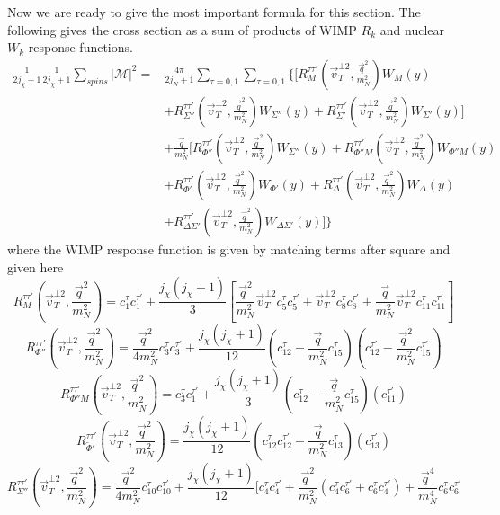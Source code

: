 \documentclass[12pt]{article}
\begin{document}
Now we are ready to give the most important formula for this section. The following gives the cross section as a sum of products of WIMP $R_k$ and nuclear $W_k$ response functions. 
$$
\begin{aligned}
\frac{1}{2j_\chi + 1}\frac{1}{2j_\chi + 1} \sum_{spins} | \mathcal M | ^2 = 
&
\frac{4\pi }{2j_N +1}\sum_{\tau=0,1}\sum_{\tau=0,1}
\{
[R^{\tau\tau'}_M(\vec v_T^{\bot2},\frac{\vec q^2}{m_N^2})
 W_M(y)
 \\
 &
+ R^{\tau\tau'}_{\Sigma''} (\vec v_T^{\bot2},\frac{\vec q^2}{m_N^2})
W_{\Sigma''}(y)
+ R^{\tau\tau'}_{\Sigma'} (\vec v_T^{\bot2},\frac{\vec q^2}{m_N^2})
W_{\Sigma'}(y)
]\\
&
+\frac{\vec q}{m_N^2}[
R^{\tau\tau'}_{\Phi''} (\vec v_T^{\bot2},\frac{\vec q^2}{m_N^2})
W_{\Sigma''}(y)
+ R^{\tau\tau'}_{\Phi''M} (\vec v_T^{\bot2},\frac{\vec q^2}{m_N^2})
W_{\Phi''M}(y)
 \\
 &
+ R^{\tau\tau'}_{\Phi'} (\vec v_T^{\bot2},\frac{\vec q^2}{m_N^2})
W_{\Phi'}(y)
+ R^{\tau\tau'}_{\Delta} (\vec v_T^{\bot2},\frac{\vec q^2}{m_N^2})
W_{\Delta}(y)
 \\
 &
+ R^{\tau\tau'}_{\Delta\Sigma'} (\vec v_T^{\bot2},\frac{\vec q^2}{m_N^2})
W_{\Delta\Sigma'}(y)
]
\}
\end{aligned}
$$
where the WIMP response function is given by matching terms after square and given here
$$
R_M ^{\tau \tau'} ( \vec v_T^{\bot2}
, \frac{\vec q^2}{m_N^2})
= c_1^\tau c_1^{\tau' } + \frac{j_\chi (j_\chi +1)}{3} [\frac{\vec q^2}{m_N^2} 
\vec v_T^{\bot2} c_5^\tau c_5^{\tau'}
+\vec v_T^{\bot2} c_8^\tau c_8^{\tau'}+\frac{\vec q}{m_N^2} \vec v_T^{\bot2} c_{11}^\tau c_{11}^{\tau'} ]
$$
$$
R_{\Phi''} ^{\tau \tau'} ( \vec v_T^{\bot2}, \frac{\vec q^2}{m_N^2})
= \frac{\vec q^2}{4m_N^2} c_3^\tau c_3^{\tau' } + \frac{j_\chi (j_\chi +1)}{12} (
c_{12}^\tau - \frac{\vec q}{m_N^2}c_{15}^\tau)(c_{12}^{\tau'} - \frac{ \vec q^2 }{ m_N^2 } c_{15}^{\tau'})
$$
$$
R_{\Phi''M} ^{\tau \tau'} ( \vec v_T^{\bot2}, \frac{\vec q^2}{m_N^2})
=  c_3^\tau c_1^{\tau' } + \frac{j_\chi (j_\chi +1)}{3} (
c_{12}^\tau - \frac{\vec q}{m_N^2}c_{15}^\tau)(c_{11}^{\tau'})
$$
$$
R_{\tilde \Phi'} ^{\tau \tau'} ( \vec v_T^{\bot2}, \frac{\vec q^2}{m_N^2})
=  \frac{j_\chi (j_\chi +1)}{12} (
c_{12}^\tau c_{12}^{\tau'} - \frac{\vec q}{m_N^2}c_{13}^\tau)(c_{13}^{\tau'})
$$
$$
R_{ \Sigma''} ^{\tau \tau'} ( \vec v_T^{\bot2}, \frac{\vec q^2}{m_N^2})
=  \frac{\vec q^2}{4m_N^2} c_{10}^\tau c_{10}^{\tau' } +\frac{j_\chi (j_\chi +1)}{12} [
c_{4}^\tau c_{4}^{\tau'} + \frac{\vec q^2}{m_N^2}(c_{4}^\tau c_{6}^{\tau'}+c_6^\tau c_{4}^{\tau'})+\frac{\vec q^4}{m_N^4}c_{6}^\tau c_{6}^{\tau'}
$$
\end{document}

